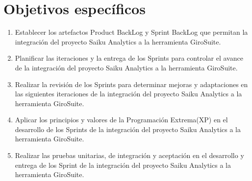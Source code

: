 \section{Objetivos espec\'{i}ficos}
\begin{spacing}{1.5}
	\begin{enumerate}[label=\alph*)]
		\item Establecer los artefactos Product BackLog y Sprint BackLog que permitan la integraci\'{o}n del proyecto Saiku Analytics a la herramienta GiroSuite.
		\item Planificar las iteraciones y la entrega de los Sprints para controlar el avance de la integraci\'{o}n del proyecto Saiku Analytics a la herramienta GiroSuite.
		\item Realizar la revisi\'{o}n de los Sprints para determinar mejoras y adaptaciones en las siguientes iteraciones de la integraci\'{o}n del proyecto Saiku Analytics a la herramienta GiroSuite.
		\item Aplicar los principios y valores de la Programaci\'{o}n Extrema(XP) en el desarrollo de los Sprints de la integraci\'{o}n del proyecto Saiku Analytics a la herramienta GiroSuite.
		\item Realizar las pruebas unitarias, de integraci\'{o}n y aceptaci\'{o}n en el desarrollo y entrega de los Sprint de  la integraci\'{o}n del proyecto Saiku Analytics a la herramienta GiroSuite.\\
	\end{enumerate}	
\end{spacing}


	
